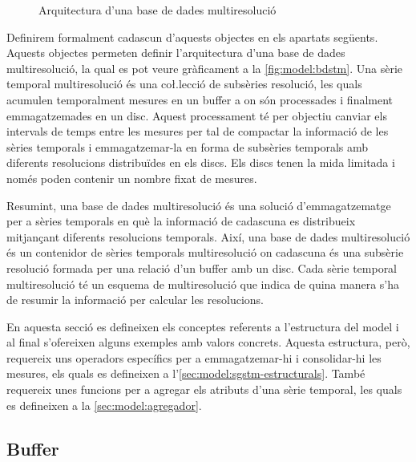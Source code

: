 \begin{figure}[tp]
\centering

\caption{Arquitectura d'una base de dades multiresolució}
\label{fig:model:bdstm}
\end{figure}

Definirem formalment cadascun d'aquests objectes en els apartats
següents.  Aquests objectes permeten definir l'arquitectura d'una base
de dades multiresolució, la qual es pot veure gràficament a la
\autoref{fig:model:bdstm}.  Una sèrie temporal multiresolució és una
co\l.lecció de subsèries resolució, les quals acumulen temporalment
mesures en un buffer a on són processades i finalment emmagatzemades
en un disc. Aquest processament té per objectiu canviar els intervals
de temps entre les mesures per tal de compactar la informació de les
sèries temporals i emmagatzemar-la en forma de subsèries temporals amb
diferents resolucions distribuïdes en els discs. Els discs tenen la
mida limitada i només poden contenir un nombre fixat de
mesures.%


Resumint, una base de dades multiresolució és una
solució d'emmagatzematge per a sèries temporals en què la informació
de cadascuna es distribueix mitjançant diferents resolucions
temporals. Així, una base de dades multiresolució és un contenidor de
sèries temporals multiresolució on cadascuna és una subsèrie resolució
formada per una relació d'un buffer amb un disc. Cada sèrie temporal
multiresolució té un esquema de multiresolució que indica de quina
manera s'ha de resumir la informació per calcular les resolucions.






En aquesta secció es defineixen els conceptes referents a l'estructura
del model i al final s'ofereixen alguns exemples amb valors
concrets. Aquesta estructura, però, requereix uns operadors específics
per a emmagatzemar-hi i consolidar-hi les mesures, els quals es
defineixen a l'\autoref{sec:model:sgstm-estructurals}. També requereix
unes funcions per a agregar els atributs d'una sèrie temporal, les
quals es defineixen a la \autoref{sec:model:agregador}.




\subsection{Buffer}\label{sec:model:buffer}



